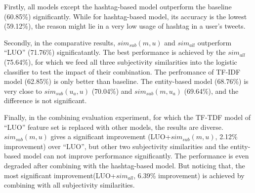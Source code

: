 \documentclass{acm_proc_article-sp}
\begin{document}
Firstly, all models except the hashtag-based model outperform the baseline (60.85\%) significantly. While for hashtag-based model, its accuracy is the lowest (59.12\%), the reason might lie in a very low usage of hashtag in a user's tweets. 

Secondly, in the comparative results, $ sim_{sub} \left( m,u \right) $ and $ sim_{all}  $ outperform ``LUO'' (71.76\%) significatantly.
The best performance is achieved by the $ sim_{all}  $ (75.64\%), for which we feed all three subjectivity similarities into the logistic classifier to test the impact of their combination. 
The perfromance of TF-IDF model (62.85\%) is only better than baseline. 
The entity-based model (68.76\%) is very close to  $ sim_{sub}\left( u_{a},u \right)$ (70.04\%) and $ sim_{sub}\left( m,u_{a} \right)  $ (69.64\%), and the difference is not significant.

Finally, in the combining evaluation experiment, for which the TF-TDF model of ``LUO'' feature set is replaced with other models, the results are diverse. $ sim_{sub} \left( m,u \right) $ gives a significant improvement (LUO+$ sim_{sub} \left( m,u \right) $, 2.12\% improvement) over ``LUO'', but other two subjectivity similarities and the entity-based model can not improve performance significantly. The performance is even degraded after combining with the hashtag-based model. 
But noticing that, the most significant improvement(LUO+$ sim_{all}  $, 6.39\% improvement) is achieved by combining with all subjectivity similarities. 
\end{document}
